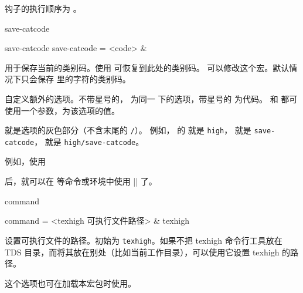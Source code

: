 \documentclass[class=article,openany]{cusdoc}[2025/10/10]
\begin{document}
钩子的执行顺序为       。

\begin{keyval}[path=high]{save-catcode}
  \begin{syntax}
    save-catcode
    save-catcode = <code> &~
  \end{syntax}
用于保存当前的类别码。使用  可恢复到此处的类别码。 可以修改这个宏。默认情况下只会保存  里的字符的类别码。
\end{keyval}

\begin{function}{\texhighdefstyle}
  \begin{syntax}
    \V\texhighdefstyle   {} 
    \V\texhighdefstyle   {}  
    \V\texhighdefstyle *  
    \V\texhighdefstyle *   
  \end{syntax}
自定义额外的选项。不带星号的， 为同一  下的选项，带星号的  为代码。 和  都可使用一个参数，为该选项的值。

 就是选项的灰色部分（不含末尾的 \texttt{/}）。
例如， 的  就是 \texttt{high}，
 就是 \texttt{save-catcode}， 就是 \texttt{high/save-catcode}。
\end{function}

例如，使用
\begin{thverbatim}
\end{thverbatim}
后，就可以在  等命令或环境中使用 \texhighverb|| 了。

\begin{keyval}[path=high,added=2025/09/29]{command}
  \begin{syntax}
    command = <{texhigh 可执行文件路径}> & texhigh
  \end{syntax}
设置可执行文件的路径。初始为 \texttt{texhigh}。如果不把 texhigh 命令行工具放在 TDS 目录，而将其放在别处（比如当前工作目录），可以使用它设置 texhigh 的路径。

这个选项也可在加载本宏包时使用。
\end{keyval}
\end{document}
